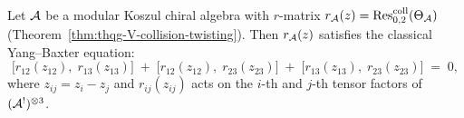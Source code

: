 \begin{theorem}
\label{thm:thqg-V-cybe-from-arnold}
Let $\mathcal{A}$ be a modular Koszul chiral algebra with $r$-matrix
$r_{\mathcal{A}}(z) = \operatorname{Res}^{\mathrm{coll}}_{0,2}(\Theta_{\mathcal{A}})$
\textup{(}Theorem~\textup{\ref{thm:thqg-V-collision-twisting})}.
Then $r_{\mathcal{A}}(z)$ satisfies the classical Yang--Baxter equation:
\begin{equation}%
\bigl[r_{12}(z_{12}),\;r_{13}(z_{13})\bigr]
\;+\;
\bigl[r_{12}(z_{12}),\;r_{23}(z_{23})\bigr]
\;+\;
\bigl[r_{13}(z_{13}),\;r_{23}(z_{23})\bigr]
\;=\; 0,
\end{equation}
where $z_{ij} = z_i - z_j$ and $r_{ij}(z_{ij})$ acts on the
$i$-th and $j$-th tensor factors of
$(\mathcal{A}^!)^{\otimes 3}$.
\end{theorem}

